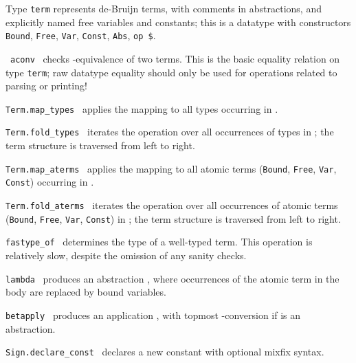 \begin{isabellebody}
\begin{isamarkuptext}
  \begin{description}

  \item Type \verb|term| represents de-Bruijn terms, with comments
  in abstractions, and explicitly named free variables and constants;
  this is a datatype with constructors \verb|Bound|, \verb|Free|, \verb|Var|, \verb|Const|, \verb|Abs|, \verb|op $|.

  \item {}~\verb|aconv|~ checks \isa{{\isasymalpha}}-equivalence of two terms.  This is the basic equality relation
  on type \verb|term|; raw datatype equality should only be used
  for operations related to parsing or printing!

  \item \verb|Term.map_types|~ applies the mapping  to all types occurring in .

  \item \verb|Term.fold_types|~ iterates the operation
   over all occurrences of types in ; the term
  structure is traversed from left to right.

  \item \verb|Term.map_aterms|~ applies the mapping  to all atomic terms (\verb|Bound|, \verb|Free|, \verb|Var|, \verb|Const|) occurring in .

  \item \verb|Term.fold_aterms|~ iterates the operation
   over all occurrences of atomic terms (\verb|Bound|, \verb|Free|, \verb|Var|, \verb|Const|) in ; the term structure is
  traversed from left to right.

  \item \verb|fastype_of|~ determines the type of a
  well-typed term.  This operation is relatively slow, despite the
  omission of any sanity checks.

  \item \verb|lambda|~ produces an abstraction , where occurrences of the atomic term  in the
  body  are replaced by bound variables.

  \item \verb|betapply|~ produces an application , with topmost \isa{{\isasymbeta}}-conversion if  is an
  abstraction.

  \item \verb|Sign.declare_const|~
  declares a new constant  with optional mixfix
  syntax.


\end{description}
\end{isamarkuptext}
\end{isabellebody}
